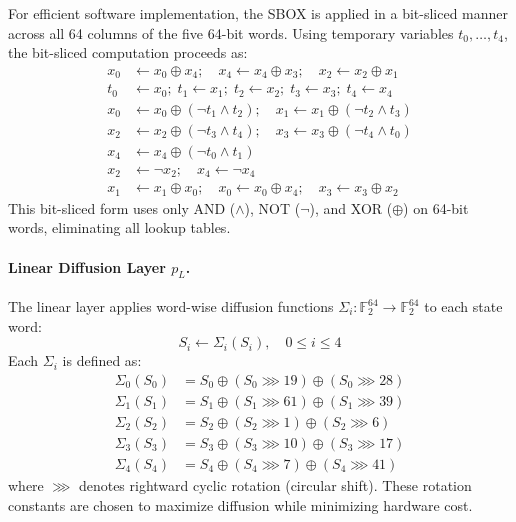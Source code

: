 \documentclass[11pt,a4paper]{article}
\newcommand{\F}{\mathbb{F}}
\newcommand{\xor}{\oplus}
\begin{document}
For efficient software implementation, the SBOX is applied in a bit-sliced manner across all 64 columns of the five 64-bit words. Using temporary variables $t_0,\ldots,t_4$, the bit-sliced computation proceeds as:
\begin{align}
x_0 &\leftarrow x_0 \xor x_4; \quad x_4 \leftarrow x_4 \xor x_3; \quad x_2 \leftarrow x_2 \xor x_1 \nonumber\\
t_0 &\leftarrow x_0;\; t_1 \leftarrow x_1;\; t_2 \leftarrow x_2;\; t_3 \leftarrow x_3;\; t_4 \leftarrow x_4 \nonumber\\
x_0 &\leftarrow x_0 \xor (\lnot t_1 \land t_2); \quad x_1 \leftarrow x_1 \xor (\lnot t_2 \land t_3) \nonumber\\
x_2 &\leftarrow x_2 \xor (\lnot t_3 \land t_4); \quad x_3 \leftarrow x_3 \xor (\lnot t_4 \land t_0) \nonumber\\
x_4 &\leftarrow x_4 \xor (\lnot t_0 \land t_1) \nonumber\\
x_2 &\leftarrow \lnot x_2; \quad x_4 \leftarrow \lnot x_4 \nonumber\\
x_1 &\leftarrow x_1 \xor x_0; \quad x_0 \leftarrow x_0 \xor x_4; \quad x_3 \leftarrow x_3 \xor x_2
\label{eq:ascon_sbox_bitsliced}
\end{align}
This bit-sliced form uses only AND ($\land$), NOT ($\lnot$), and XOR ($\xor$) on 64-bit words, eliminating all lookup tables.

\paragraph{Linear Diffusion Layer $p_L$.}
The linear layer applies word-wise diffusion functions $\Sigma_i: \F_2^{64} \to \F_2^{64}$ to each state word:
\begin{equation}
S_i \leftarrow \Sigma_i(S_i), \quad 0 \leq i \leq 4
\label{eq:ascon_pl}
\end{equation}
Each $\Sigma_i$ is defined as:
\begin{align}
\Sigma_0(S_0) &= S_0 \xor (S_0 \ggg 19) \xor (S_0 \ggg 28) \nonumber\\
\Sigma_1(S_1) &= S_1 \xor (S_1 \ggg 61) \xor (S_1 \ggg 39) \nonumber\\
\Sigma_2(S_2) &= S_2 \xor (S_2 \ggg 1) \xor (S_2 \ggg 6) \nonumber\\
\Sigma_3(S_3) &= S_3 \xor (S_3 \ggg 10) \xor (S_3 \ggg 17) \nonumber\\
\Sigma_4(S_4) &= S_4 \xor (S_4 \ggg 7) \xor (S_4 \ggg 41)
\label{eq:ascon_sigma}
\end{align}
where $\ggg$ denotes rightward cyclic rotation (circular shift). These rotation constants are chosen to maximize diffusion while minimizing hardware cost.
\end{document}
